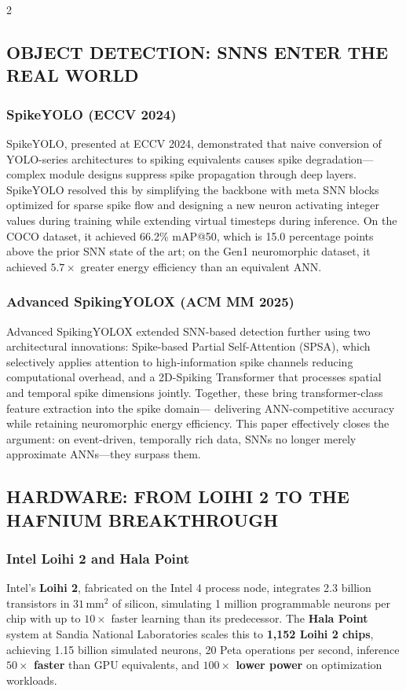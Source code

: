 \begin{multicols}{2}
  \subsection*{\uppercase{Object Detection: SNNs Enter the Real World}}
  \subsubsection*{SpikeYOLO (ECCV 2024)}
  SpikeYOLO, presented at ECCV 2024, demonstrated that naive conversion of YOLO-series architectures to
  spiking equivalents causes spike degradation---complex module designs suppress spike propagation through
  deep layers. SpikeYOLO resolved this by simplifying the backbone with meta SNN blocks optimized for sparse
  spike flow and designing a new neuron activating integer values during training while extending virtual
  timesteps during inference. On the COCO dataset, it achieved 66.2\% mAP@50, which is 15.0 percentage points above the prior SNN
  state of the art; on the Gen1 neuromorphic dataset, it achieved \(5.7\times\) greater energy efficiency than an equivalent ANN.

  \subsubsection*{Advanced SpikingYOLOX (ACM MM 2025)}
  Advanced SpikingYOLOX extended SNN-based detection further using two architectural innovations: Spike-based Partial Self-Attention (SPSA), which selectively applies attention to high-information spike channels
  reducing computational overhead, and a 2D-Spiking Transformer that processes spatial and temporal spike
  dimensions jointly. Together, these bring transformer-class feature extraction into the spike domain---
  delivering ANN-competitive accuracy while retaining neuromorphic energy efficiency. This paper effectively
  closes the argument: on event-driven, temporally rich data, SNNs no longer merely approximate ANNs---they
  surpass them.

  \subsection*{\centering\uppercase{Hardware: From Loihi 2 to the Hafnium Breakthrough}}
  \subsubsection*{Intel Loihi 2 and Hala Point}
  Intel's \textbf{Loihi 2}, fabricated on the Intel 4 process node, integrates 2.3 billion transistors in \(31\,\mathrm{mm}^2\) of silicon,
  simulating 1 million programmable neurons per chip with up to \(10\times\) faster learning than its predecessor.
  The \textbf{Hala Point} system at Sandia National Laboratories scales this to \textbf{1,152 Loihi 2 chips}, achieving 1.15
  billion simulated neurons, 20 Peta operations per second, inference \textbf{\(50\times\) faster} than GPU equivalents, and \textbf{\(100\times\) lower power} on optimization workloads.
\end{multicols}

